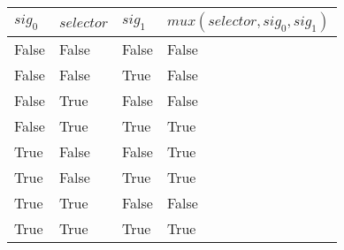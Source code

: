 \begin{tabular}{llll}\(sig_0\) & \(selector\) & \(sig_1\) &
                                                            \(mux(selector,
                                                            sig_0, sig_1)\)\\\hline False & False & False & False \\False & False & True & False \\False & True & False & False \\False & True & True & True \\True & False & False & True \\True & False & True & True \\True & True & False & False \\True & True & True & True\end{tabular}
